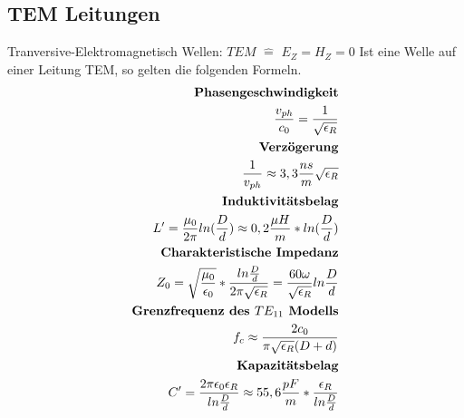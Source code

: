 \documentclass[11pt]{scrartcl}
\begin{document}
\subsection{TEM Leitungen}
Tranversive-Elektromagnetisch Wellen: $TEM$ $\hat=$ $E_Z=H_Z=0$ 
Ist eine Welle auf einer Leitung TEM, so gelten die folgenden Formeln.
\begin{eqnarray}
	\text{\textbf{Phasengeschwindigkeit}} \\
	\frac{v_{ph}}{c_0}=\frac{1}{\sqrt{\epsilon_R}} \\
	\text{\textbf{Verzögerung}} \\
	\frac{1}{v_{ph}}\approx 3,3 \frac{ns}{m} \sqrt{\epsilon_R} \\
	\text{\textbf{Induktivitätsbelag}} \\
	L'=\frac{\mu_0}{2\pi}ln(\frac{D}{d}) \approx 0,2\frac{\mu H}{m}*ln(\frac{D}{d}) \\
	\text{\textbf{Charakteristische Impedanz}} \\
	Z_0 = \sqrt{\frac{\mu_0}{\epsilon_0}} * \frac{ln\frac{D}{d}}{2 \pi \sqrt{\epsilon_R}} = \frac{60 \omega}{\sqrt{\epsilon_R}} ln \frac{D}{d} \\
	\text{\textbf{Grenzfrequenz des $TE_{11}$ Modells}} \\
	f_c \approx \frac{2 c_0}{\pi \sqrt{\epsilon_R}(D+d)} \\
	\text{\textbf{Kapazitätsbelag}} \\
	C'= \frac{2 \pi \epsilon_0 \epsilon_R}{ln \frac{D}{d}} \approx 55,6\frac{pF}{m}*\frac{\epsilon_R}{ln\frac{D}{d}} \\
\end{eqnarray}
\end{document}
